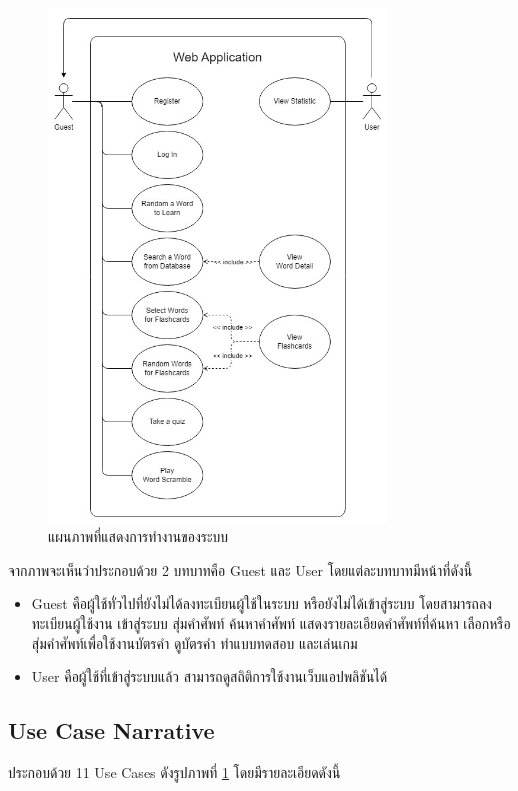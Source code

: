 \documentclass[12pt,oneside,openright,a4paper]{cpe-thai-project}
\begin{document}
\begin{figure}[!h]\centering
	\includegraphics[width=0.8\textwidth, keepaspectratio=true]{image/chap3/UseCaseDiagram.jpg}
	\caption{แผนภาพที่แสดงการทำงานของระบบ}\label{fig:UseCaseDiagram}
\end{figure}

\hspace{1cm}
จากภาพจะเห็นว่าประกอบด้วย 2 บทบาทคือ Guest และ User โดยแต่ละบทบาทมีหน้าที่ดังนี้
\begin{itemize}
	\item Guest คือผู้ใช้ทั่วไปที่ยังไม่ได้ลงทะเบียนผู้ใช้ในระบบ หรือยังไม่ได้เข้าสู่ระบบ
	      โดยสามารถลงทะเบียนผู้ใช้งาน เข้าสู่ระบบ สุ่มคำศัพท์ ค้นหาคำศัพท์ แสดงรายละเอียดคำศัพท์ที่ค้นหา
	      เลือกหรือสุ่มคำศัพท์เพื่อใช้งานบัตรคำ ดูบัตรคำ ทำแบบทดสอบ และเล่นเกม
	\item User คือผู้ใช้ที่เข้าสู่ระบบแล้ว สามารถดูสถิติการใช้งานเว็บแอปพลิชันได้
\end{itemize}

\subsection{Use Case Narrative}
ประกอบด้วย 11 Use Cases ดังรูปภาพที่ \ref{fig:UseCaseDiagram} โดยมีรายละเอียดดังนี้
\end{document}

